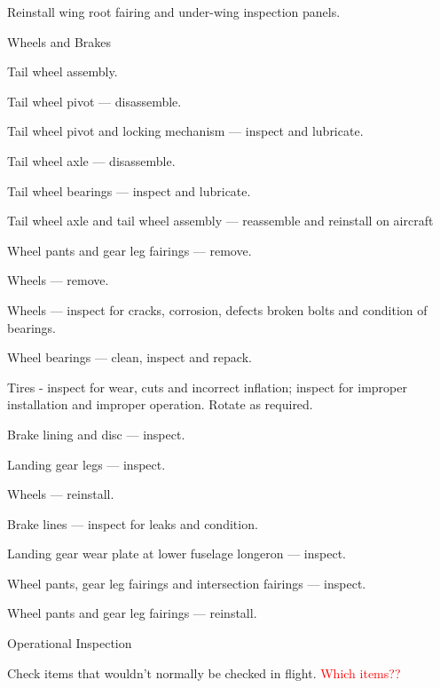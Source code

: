 \begin{enumerate*}
\begin{enumerate*}
		\item Reinstall wing root fairing and under-wing inspection panels. 
	\end{enumerate*}
	\item{Wheels and Brakes} 
	\begin{enumerate*}
		\item Tail wheel assembly. 
		\begin{enumerate*}
		  \item Tail wheel pivot --- disassemble.
		  \item Tail wheel pivot and locking mechanism --- inspect and lubricate.
		  \item Tail wheel axle --- disassemble.
		  \item Tail wheel bearings --- inspect and lubricate.
		  \item Tail wheel axle and tail wheel assembly --- reassemble and reinstall on aircraft
	  \end{enumerate*}
		\item Wheel pants and gear leg fairings --- remove. 
		\item Wheels --- remove.
		\item Wheels --- inspect for cracks, corrosion, defects broken bolts and condition of bearings.
		\item Wheel bearings --- clean, inspect and repack.
		\item Tires - inspect for wear, cuts and incorrect inflation; inspect for improper installation and improper operation.  Rotate as required.
		\item Brake lining and disc --- inspect.
		\item Landing gear legs --- inspect.
		\item Wheels --- reinstall. 
		\item Brake lines --- inspect for leaks and condition.
		\item Landing gear wear plate at lower fuselage longeron --- inspect.
		\item Wheel pants, gear leg fairings and intersection fairings ---  inspect.
		\item Wheel pants and gear leg fairings --- reinstall. 
	\end{enumerate*}
	\item{Operational Inspection} 
	\begin{enumerate*}
		\item Check items that wouldn't normally be checked in flight. \textcolor{red}{Which items??} 
	\end{enumerate*}

\end{enumerate*}
